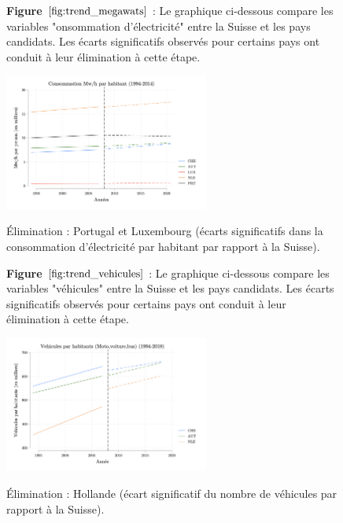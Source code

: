 
        \begin{figure}[H]
\textbf{Figure {$\ref{fig:trend_megawats}$}} : Le graphique ci-dessous compare les variables "onsommation d'électricité" entre la Suisse et les pays candidats. Les écarts significatifs observés pour certains pays ont conduit à leur élimination à cette étape.


        \centering
        \includegraphics[width=0.6\textwidth]{Article/images/trend_electricite.png}
        \caption{}
        \label{fig:trend_megawats}
\begin{center}
Élimination : Portugal et Luxembourg (écarts significatifs dans la consommation d'électricité par habitant par rapport à la Suisse).
\end{center}
    \end{figure}

    



\begin{figure}[H]
\textbf{Figure {$\ref{fig:trend_vehicules}$}} : Le graphique ci-dessous compare les variables "véhicules" entre la Suisse et les pays candidats. Les écarts significatifs observés pour certains pays ont conduit à leur élimination à cette étape.


\centering
\includegraphics[width=0.6\textwidth]{Article/images/trend_vehicules.png}
\caption{}
\label{fig:trend_vehicules}
\begin{center}
    Élimination : Hollande (écart significatif du nombre de véhicules par rapport à la Suisse).
\end{center}
\end{figure}





